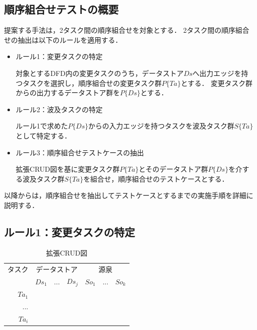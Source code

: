 \subsection{順序組合せテストの概要} \label{sec:5-2-1}
提案する手法は，2タスク間の順序組合せを対象とする．
2タスク間の順序組合せの抽出は以下のルールを適用する．
\begin{itemize}

\item ルール1：変更タスクの特定

対象とするDFD内の変更タスクのうち，データストア$Ds$へ出力エッジを持つタスクを選択し，順序組合せの変更タスク群$P\{Ta\}$とする．%
変更タスク群からの出力するデータストア群を$P\{Ds\}$とする．

\item ルール2：波及タスクの特定

ルール1で求めた$P\{Ds\}$からの入力エッジを持つタスクを波及タスク群$S\{Ta\}$として特定する．

\item ルール3：順序組合せテストケースの抽出

拡張CRUD図を基に変更タスク群$P\{Ta\}$とそのデータストア群$P\{Ds\}$を介する波及タスク群$S\{Ta\}$を組合せ，順序組合せのテストケースとする．
\end{itemize}

以降からは，順序組合せを抽出してテストケースとするまでの実施手順を詳細に説明する．

\subsection{ルール1：変更タスクの特定}
\begin{table}[t]
\caption{拡張CRUD図}
\label{CRUDIO}
\begin{center}
\begin{tabular}{r|r|r|r|r|r|r}
\multicolumn{1}{c|}{タスク} & \multicolumn{3}{c|}{データストア} & \multicolumn{3}{c}{源泉} \\
\cline{2-7}\multicolumn{1}{c|}{} & $Ds_1$ & $...$ & $Ds_j$ & $So_1$ & $...$ & $So_k$ \\
\hline
\hline
$Ta_1$ &   &   &   &   &   &  \\
\hline
$...$ &   &   &   &   &   &  \\
\hline
$Ta_i$ &   &   &   &   &   &  \\
    \hline
\end{tabular}%
\end{center}
\end{table}

